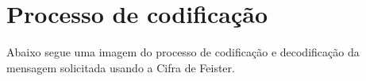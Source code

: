 \documentclass[a4paper,pra,aps,twocolumn,superscriptaddress,10pt,final]{revtex4-2}
\begin{document}

\appendix

\section{Processo de codificação}
\label{apx:code}

    Abaixo segue uma imagem do processo de codificação e decodificação da mensagem solicitada usando a Cifra de Feister.

\onecolumngrid

\end{document}
